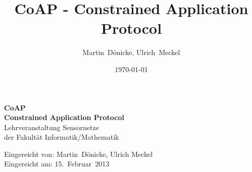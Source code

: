 \documentclass[a4paper, oneside, 12pt]{scrartcl}
\title{CoAP - Constrained Application Protocol}
\author{Martin~Dönicke, Ulrich~Meckel}
\date{\today}
\begin{document}
\begin{titlepage}
\begin{center}
\vspace*{380pt}
\huge{\textbf{CoAP\\Constrained Application Protocol}}\\
\vspace{0.75cm}
\large{Lehrveranstaltung Sensornetze}\\
\large{der Fakultät Informatik/Mathematik}\\
\vspace{1.5cm}
\end{center}
\vfill
Eingereicht von: Martin~Dönicke, Ulrich Meckel\\
Eingereicht am: 15.~Februar~2013\\
\end{titlepage}

\thispagestyle{empty}
\newpage
\tableofcontents








\renewcommand{\bibname}{Quellenverzeichnis} %



\dedication{ }
\end{document}

